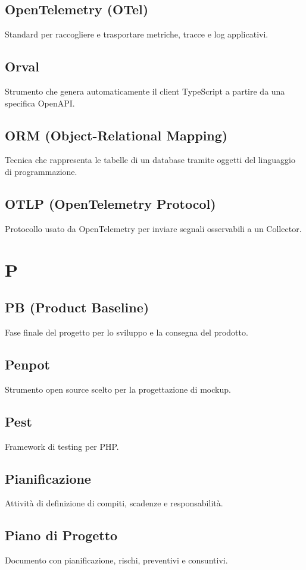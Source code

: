 \documentclass[a4paper,12pt]{article}
\begin{document}
\subsection{OpenTelemetry (OTel)}
Standard per raccogliere e trasportare metriche, tracce e log applicativi.

\subsection{Orval}
Strumento che genera automaticamente il client TypeScript a partire da una specifica OpenAPI.

\subsection{ORM (Object-Relational Mapping)}
Tecnica che rappresenta le tabelle di un database tramite oggetti del linguaggio di programmazione.

\subsection{OTLP (OpenTelemetry Protocol)}
Protocollo usato da OpenTelemetry per inviare segnali osservabili a un Collector.

\section{P}
\subsection{PB (Product Baseline)}
Fase finale del progetto per lo sviluppo e la consegna del prodotto.

\subsection{Penpot}
Strumento open source scelto per la progettazione di mockup.

\subsection{Pest}
Framework di testing per PHP.

\subsection{Pianificazione}
Attività di definizione di compiti, scadenze e responsabilità.

\subsection{Piano di Progetto}
Documento con pianificazione, rischi, preventivi e consuntivi.
\end{document}
